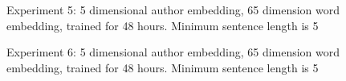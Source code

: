 \documentclass{article}%
\begin{document}
\begin{figure}
\noindent{}
\caption{Experiment 5: 5 dimensional author embedding, 65 dimension word embedding, trained for 48 hours. Minimum sentence length is 5}
\end{figure}
\begin{figure}
\noindent{}
\caption{Experiment 6: 5 dimensional author embedding, 65 dimension word embedding, trained for 48 hours. Minimum sentence length is 5}
\end{figure}
\end{document}
